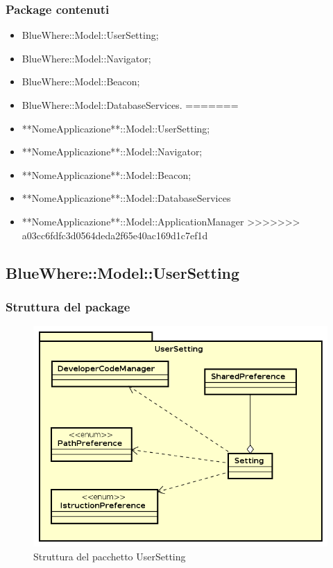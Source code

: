 \documentclass[../SpecificaTecnica.tex]{subfiles}
\begin{document}
		\subsubsection{Package contenuti}
			\begin{itemize}
<<<<<<< HEAD
				\item BlueWhere::Model::UserSetting;
				\item BlueWhere::Model::Navigator;
				\item BlueWhere::Model::Beacon;
				\item BlueWhere::Model::DatabaseServices.
=======
				\item **NomeApplicazione**::Model::UserSetting;
				\item **NomeApplicazione**::Model::Navigator;
				\item **NomeApplicazione**::Model::Beacon;
				\item **NomeApplicazione**::Model::DatabaseServices
				\item **NomeApplicazione**::Model::ApplicationManager
>>>>>>> a03cc6fdfc3d0564deda2f65e40ac169d1c7ef1d
			\end{itemize}
			\newpage
	\subsection{BlueWhere::Model::UserSetting}
		\subsubsection{Struttura del package}
			\begin{figure}[!h]
				\centering
				\includegraphics[scale=0.6]{diagrammi/UserSetting.png}
					\caption{Struttura del pacchetto UserSetting}
				\label{fig:Struttura_MVP}
			\end{figure} 
\end{document}
